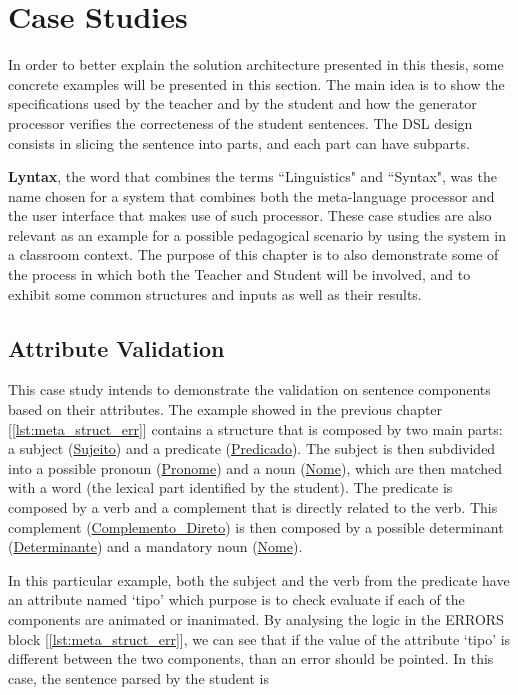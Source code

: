 \chapter{Case Studies} \label{case_study}
In order to better explain the solution architecture presented in this thesis, some concrete examples will be presented in this section. 
The main idea is to show the specifications used by the teacher and by the student and how the generator processor verifies the correcteness of the student sentences. 
The DSL design consists in slicing the sentence into parts, and each part can have subparts.

\textbf{Lyntax}, the word that combines the terms ``Linguistics" and ``Syntax", was the name chosen for a system that combines both the meta-language processor and
the user interface that makes use of such processor.
These case studies are also relevant as an example for a possible pedagogical scenario by using the system in a classroom context.
The purpose of this chapter is to also demonstrate some of the process in which both the Teacher and Student will be involved, and to exhibit some common structures
and inputs as well as their results.

\section{Attribute Validation}
This case study intends to demonstrate the validation on sentence components based on their attributes. The example showed in the previous chapter 
[\ref{lst:meta_struct_err}] contains a structure that is composed by two main parts: a subject (\underline{Sujeito}) and a predicate (\underline{Predicado}). 
The subject is then subdivided into a possible pronoun (\underline{Pronome}) and a noun (\underline{Nome}), which are then matched with a word 
(the lexical part identified by the student). The predicate is composed by a verb and a complement that is directly related to the verb. This complement 
(\underline{Complemento\_Direto}) is then composed by a possible determinant (\underline{Determinante}) and a mandatory noun (\underline{Nome}).

In this particular example, both the subject and the verb from the predicate have an attribute named ‘tipo’ which purpose is to check evaluate if each of the components
are animated or inanimated. By analysing the logic in the ERRORS block [\ref{lst:meta_struct_err}], we can see that if the value of the attribute ‘tipo’ is different 
between the two components, than an error should be pointed. In this case, the sentence parsed by the student is

